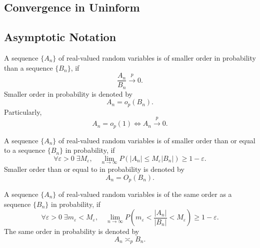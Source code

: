 \begin{remark}

\end{remark}

\subsection{Convergence in Uninform}

\begin{definition}

\end{definition}

\subsection{Asymptotic Notation}

\begin{definition}
	A sequence \(\{A_n\}\) of real-valued random variables is of smaller order in probability than a sequence \(\{B_n\}\), if
	\begin{equation}
		\frac{A_n}{B_n}\stackrel{p}{\rightarrow}0.
	\end{equation}
	Smaller order in probability is denoted by
	\begin{equation}
		A_n=o_p(B_n).
	\end{equation}
	Particularly,
	\begin{equation}
		A_n=o_p(1)\iff A_n\stackrel{p}{\rightarrow}0.
	\end{equation}
\end{definition}

\begin{definition}
	A sequence \(\{A_n\}\) of real-valued random variables is of smaller order than or equal to a sequence \(\{B_n\}\) in probability, if
	\begin{equation}
		\forall\varepsilon>0\;\exists M_\varepsilon,\quad\lim_{n\rightarrow\infty} P\left(|A_n|\leq M_\varepsilon|B_n|\right)\geq 1-\varepsilon.
	\end{equation}
	Smaller order than or equal to in probability is denoted by
	\begin{equation}
		A_n=O_p(B_n).
	\end{equation}
\end{definition}

\begin{definition}
	A sequence \(\{A_n\}\) of real-valued random variables is of the same order as a sequence \(\{B_n\}\) in probability, if
	\begin{equation}
		\forall\varepsilon>0\;\exists m_{\varepsilon}<M_{\varepsilon},\quad\lim_{n\rightarrow\infty} P\left(m_{\varepsilon}<\frac{|A_{n}|}{|B_{n}|}<M_{\varepsilon}\right)\geq 1-\varepsilon.
	\end{equation}
	The same order in probability is denoted by
	\begin{equation}
		A_{n}\asymp_{p}B_{n}.
	\end{equation}
\end{definition}


